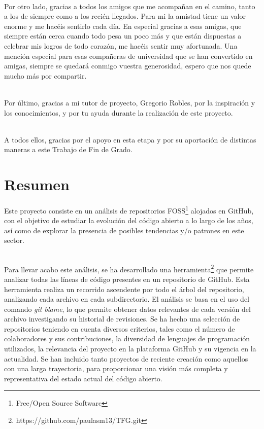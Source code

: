 \documentclass[a4paper, 12pt]{book}
\begin{document}
\\Por otro lado, gracias a todos los amigos que me acompañan en el camino, tanto a los de siempre como a los recién llegados. Para mi la
amistad tiene un valor enorme y me hacéis sentirlo cada día. En especial gracias a esas amigas, que siempre están cerca cuando todo pesa un poco
más y que están dispuestas a celebrar mis logros de todo corazón, me hacéis sentir muy afortunada. Una mención especial para esas compañeras de universidad que se han convertido en amigas, siempre se quedará conmigo vuestra generosidad,
espero que nos quede mucho más por compartir.

\\Por último, gracias a mi tutor de proyecto, Gregorio Robles, por la inspiración y los conocimientos, y por tu ayuda durante la realización de este proyecto.

\\A todos ellos, gracias por el apoyo en esta etapa y por su aportación de distintas maneras a este Trabajo de Fin de Grado.


\chapter*{Resumen}

Este proyecto consiste en un análisis de repositorios FOSS\footnote{Free/Open Source Software} alojados en GitHub, con el
objetivo de estudiar la evolución del código abierto a lo largo de los años, así como de explorar la presencia de
posibles tendencias y/o patrones en este sector.

\\Para llevar acabo este análisis, se ha desarrollado una herramienta\footnote{https://github.com/paulasm13/TFG.git} que permite analizar todas las líneas de código presentes
en un repositorio de GitHub. Esta herramienta realiza un recorrido ascendente por todo el árbol del repositorio, analizando cada
archivo en cada subdirectorio. El análisis se basa en el uso del comando \textit{git blame}, lo que permite obtener datos relevantes
de cada versión del archivo investigando su historial de revisiones. 
Se ha hecho una selección de repositorios teniendo en cuenta diversos criterios, tales como el número de colaboradores y sus
contribuciones, la diversidad de lenguajes de programación utilizados, la relevancia del proyecto en la plataforma GitHub y su 
vigencia en la actualidad. Se han incluido tanto proyectos de reciente creación como aquellos con una larga trayectoria, para
proporcionar una visión más completa y representativa del estado actual del código abierto.
\end{document}
